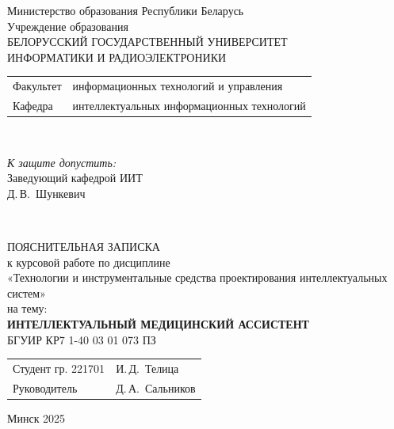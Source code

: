 \begin{titlepage}
  \begin{center}
    Министерство образования Республики Беларусь\\[1em]
    Учреждение образования\\
    БЕЛОРУССКИЙ ГОСУДАРСТВЕННЫЙ УНИВЕРСИТЕТ \\
    ИНФОРМАТИКИ И РАДИОЭЛЕКТРОНИКИ\\[1em]

    \begin{minipage}{\textwidth}
      \begin{flushleft}
        \begin{tabular}{ l l }
          Факультет & информационных технологий и управления\\
          Кафедра   & интеллектуальных информационных технологий
        \end{tabular}
      \end{flushleft}
    \end{minipage}\\[1em]

    \begin{flushright}
      \begin{minipage}{0.4\textwidth}
        \textit{К защите допустить:}\\[0.8em]
        Заведующий кафедрой ИИТ\\[0.45em]
        \underline{\hspace*{2.8cm}} Д.\,В.~Шункевич
      \end{minipage}\\[2.2em]
    \end{flushright}

    {ПОЯСНИТЕЛЬНАЯ ЗАПИСКА}\\
    {к курсовой работе
    по дисциплине \\
    «Технологии и инструментальные средства проектирования интеллектуальных систем»}\\
    {на тему:}\\[1em]
    \textbf{\large ИНТЕЛЛЕКТУАЛЬНЫЙ МЕДИЦИНСКИЙ АССИСТЕНТ}\\[1em]


    {БГУИР КР7 1-40 03 01 073 ПЗ}\\[2em]
    \vspace{2em}
    \begin{tabular}{ p{}p{} }
      Студент гр. 221701 & И.\,Д.~Телица \\
      Руководитель & Д.\,А.~Сальников \\
    \end{tabular}
    
    \vfill
    {\normalsize Минск 2025}
  \end{center}
\end{titlepage}
